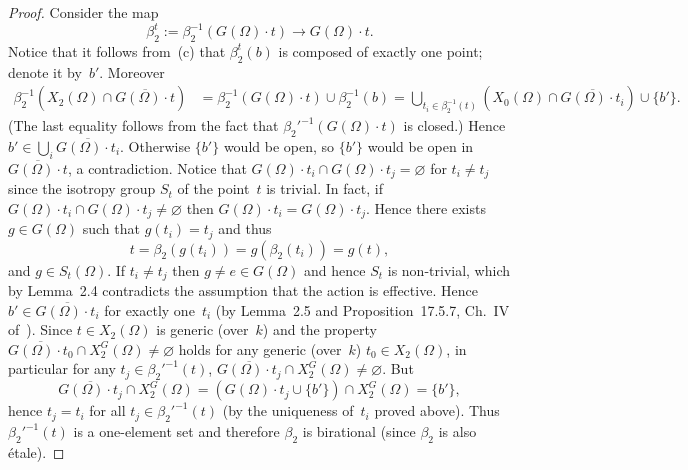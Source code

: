 \documentclass[12pt]{article}
\begin{document}
\begin{proof}
Consider the map
\[
   \beta_2^t := \beta_2^{-1}(G(\Omega)\cdot t)
      \longrightarrow G(\Omega)\cdot t .
\]
Notice that it follows from~(c) that $\beta_2^t(b)$ is composed of exactly one point; denote it by~$b'$.
Moreover
\[
\begin{aligned}
\beta_2^{-1}(X_2(\Omega)\cap \overline{G(\Omega)\cdot t})
   &= \beta_2^{-1}(G(\Omega)\cdot t)\cup \beta_2^{-1}(b)
   = \bigcup_{t_i\in\beta_2^{-1}(t)}(X_0(\Omega)\cap \overline{G(\Omega)\cdot t_i})
      \cup\{b'\}.
\end{aligned}
\]
(The last equality follows from the fact that $\beta_2'^{-1}(G(\Omega)\cdot t)$
is closed.)  Hence $b'\in\bigcup_i\overline{G(\Omega)\cdot t_i}$.
Otherwise $\{b'\}$ would be open, so $\{b'\}$ would be open in
$\overline{G(\Omega)\cdot t}$, a contradiction.
Notice that $G(\Omega)\cdot t_i\cap G(\Omega)\cdot t_j=\varnothing$
for $t_i\neq t_j$ since the isotropy group $S_t$ of the point~$t$
is trivial.  In fact, if $G(\Omega)\cdot t_i\cap G(\Omega)\cdot t_j\neq\varnothing$
then $G(\Omega)\cdot t_i=G(\Omega)\cdot t_j$.
Hence there exists $g\in G(\Omega)$ such that $g(t_i)=t_j$
and thus
\[
   t = \beta_2(g(t_i)) = g(\beta_2(t_i)) = g(t) ,
\]
and $g\in S_t(\Omega)$.
If $t_i\neq t_j$ then $g\neq e\in G(\Omega)$ and hence
$S_t$ is non-trivial, which by Lemma~2.4 contradicts the assumption
that the action is effective.
Hence $b'\in \overline{G(\Omega)\cdot t_i}$ for exactly one~$t_i$
(by Lemma~2.5 and Proposition~17.5.7, Ch.~IV of~\cite{4}).
Since $t\in X_2(\Omega)$ is generic (over~$k$) and the property
$\overline{G(\Omega)\cdot t_0}\cap X_2^G(\Omega)\neq\varnothing$
holds for any generic (over~$k$) $t_0\in X_2(\Omega)$,
in particular for any $t_j\in\beta_2'^{-1}(t)$,
$\overline{G(\Omega)\cdot t_j}\cap X_2^G(\Omega)\neq\varnothing$.
But
\[
\overline{G(\Omega)\cdot t_j}\cap X_2^G(\Omega)
  = (G(\Omega)\cdot t_j\cup\{b'\})\cap X_2^G(\Omega)
  = \{b'\},
\]
hence $t_j=t_i$ for all $t_j\in\beta_2'^{-1}(t)$
(by the uniqueness of~$t_i$ proved above).
Thus $\beta_2'^{-1}(t)$ is a one-element set and therefore
$\beta_2$ is birational (since $\beta_2$ is also \'etale).


\end{proof}
\end{document}
